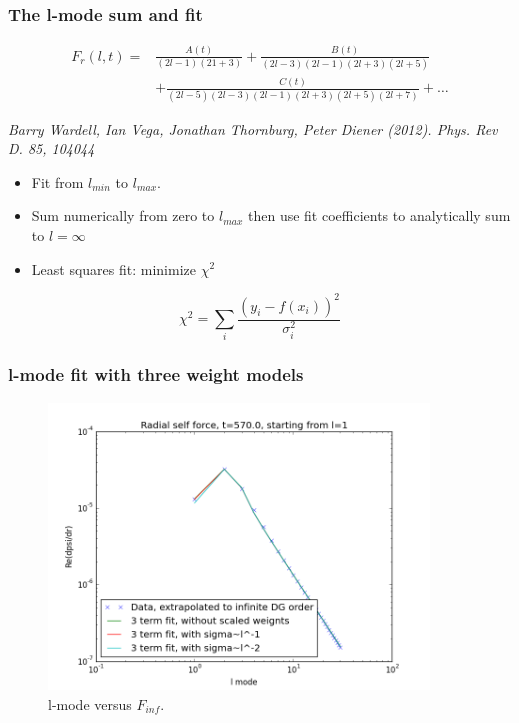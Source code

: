 \documentclass{beamer}
\begin{document}
\begin{frame}
  \frametitle{The l-mode sum and fit}
  \begin{eqnarray}
    F_r(l,t)=&\frac{A(t)}{(2l-1)(21+3)}+\frac{B(t)}{(2l-3)(2l-1)(2l+3)(2l+5)}\nonumber \\
    &+\frac{C(t)}{(2l-5)(2l-3)(2l-1)(2l+3)(2l+5)(2l+7)}+\ldots
  \end{eqnarray}

  {\em Barry Wardell, Ian Vega, Jonathan Thornburg, Peter Diener (2012). Phys. Rev D. 85, 104044}

  \begin{itemize}
  \item Fit from $l_{min}$ to $l_{max}$.
  \item Sum numerically from zero to $l_{max}$ then use fit coefficients to analytically sum to $l=\infty$
  \item Least squares fit: minimize $\chi^2$
  \end{itemize}

  \begin{equation}
    \chi^2=\sum_i\frac{(y_i-f(x_i))^2}{\sigma_i^2}
  \end{equation}

\end{frame}


\begin{frame}
  \frametitle{l-mode fit with three weight models}
  \begin{figure}
    \includegraphics[width=0.9\textwidth]{fiterrscalecorrect3term570l1}
    \caption{l-mode versus $F_{inf}$.}
  \end{figure}
\end{frame}
\end{document}
